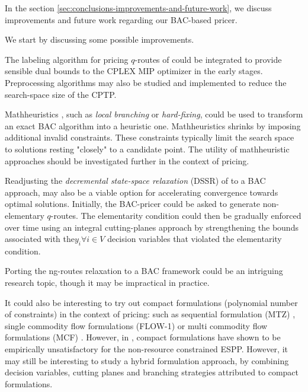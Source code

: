 In the section \cref{sec:conclusions-improvements-and-future-work}, we discuss improvements and future work regarding our BAC-based pricer.

We start by discussing some possible improvements.

The labeling algorithm for pricing $q$-routes of \textcite{desrochers1992} could be integrated to provide sensible dual bounds to the CPLEX MIP optimizer in the early stages.
Preprocessing algorithms may also be studied and implemented to reduce the search-space size of the CPTP.

Mathheuristics \parencite{fischetti2018}, such as \textit{local branching} \parencite{fischetti2003} or \textit{hard-fixing}, could be used to transform an exact BAC algorithm into a heuristic one.
Mathheuristics shrinks by imposing additional invalid constraints.
These constraints typically limit the search space to solutions resting "closely" to a candidate point.
The utility of mathheuristic approaches should be investigated further in the context of pricing.

Readjusting the \textit{decremental state-space relaxation} (DSSR) of \textcite{boland2006, righini2008, martinelli2014} to a BAC approach, may also be a viable option for accelerating convergence towards optimal solutions.
Initially, the BAC-pricer could be asked to generate non-elementary $q$-routes.
The elementarity condition could then be gradually enforced over time using an integral cutting-planes approach by strengthening the bounds associated with the$y_i \forall i \in V$ decision variables that violated the elementarity condition.

Porting the ng-routes relaxation to a BAC framework could be an intriguing research topic, though it may be impractical in practice.



It could also be interesting to try out compact formulations (polynomial number of constraints) in the context of pricing: such as sequential formulation (MTZ) \parencite{miller1960}, single commodity flow formulations (FLOW-1) \parencite{gavish1978travelling} or multi commodity flow formulations (MCF) \parencite{wong1980integer,claus1984new}.
However, in \textcite{taccari2016}, compact formulations have shown to be empirically unsatisfactory for the non-resource constrained ESPP.
However, it may still be interesting to study a hybrid formulation approach, by combining decision variables, cutting planes and branching strategies attributed to compact formulations.

